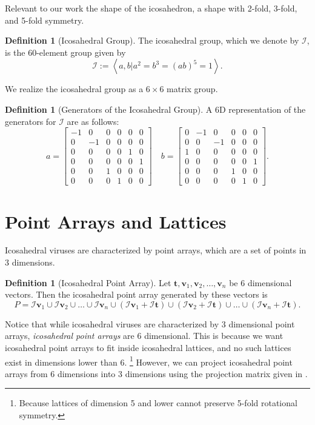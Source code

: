 \documentclass[a4paper,10pt]{article}
\let\oldfootnote\footnote
\renewcommand{\footnote}{\unskip\oldfootnote}
\theoremstyle{plain}
\theoremstyle{definition}
\newtheorem{Definition}[Theorem]{Definition}
\theoremstyle{remark}
\renewcommand{\vec}[1]{\mathbf{#1}}
\newcommand{\generatedby}[1]{\left\langle#1\right\rangle}
\begin{document}

Relevant to our work the shape of the icosahedron, a shape with 2-fold, 3-fold, and 5-fold symmetry.
\begin{Definition}[Icosahedral Group]
	The icosahedral group, which we denote by \(\mathcal{I}\), is the 60-element group given by \[\mathcal{I} := \generatedby{a, b | a^2 = b^3 = (ab)^5 = 1}.\]
\end{Definition}
\noindent We realize the icosahedral group as a \( 6 \times 6 \) matrix group.
\begin{Definition}[Generators of the Icosahedral Group]
	A 6D representation of the generators for \(\mathcal{I}\) are as follows:
	\[a = \begin{bmatrix}
		-1 & 0  & 0 & 0 & 0 & 0 \\
		0  & -1 & 0 & 0 & 0 & 0 \\
		0  & 0  & 0 & 0 & 1 & 0 \\
		0  & 0  & 0 & 0 & 0 & 1 \\
		0  & 0  & 1 & 0 & 0 & 0 \\
		0  & 0  & 0 & 1 & 0 & 0
	\end{bmatrix} \quad b = \begin{bmatrix}
		0 & -1 & 0  & 0 & 0 & 0 \\
		0 & 0  & -1 & 0 & 0 & 0 \\
		1 & 0  & 0  & 0 & 0 & 0 \\
		0 & 0  & 0  & 0 & 0 & 1 \\
		0 & 0  & 0  & 1 & 0 & 0 \\
		0 & 0  & 0  & 0 & 1 & 0
	\end{bmatrix}.\]
\end{Definition}

\section{Point Arrays and Lattices}
Icosahedral viruses are characterized by point arrays, which are a set of points in 3 dimensions.
\begin{Definition}[Icosahedral Point Array]
	Let \(\vec{t}, \vec{v}_1, \vec{v}_2, \dots, \vec{v}_n\) be 6 dimensional vectors.
	Then the icosahedral point array generated by these vectors is \[P = \mathcal{I}\vec{v}_1 \cup \mathcal{I}\vec{v}_2 \cup \dots \cup \mathcal{I}\vec{v}_n \cup (\mathcal{I}\vec{v}_1 + \mathcal{I}\vec{t}) \cup (\mathcal{I}\vec{v}_2 + \mathcal{I}\vec{t}) \cup \dots \cup (\mathcal{I}\vec{v}_n + \mathcal{I}\vec{t}).\]
\end{Definition}
Notice that while icosahedral viruses are characterized by 3 dimensional point arrays, \emph{icosahedral point arrays} are 6 dimensional.
This is because we want icosahedral point arrays to fit inside icosahedral lattices, and no such lattices exist in dimensions lower than 6.
\footnote{Because lattices of dimension 5 and lower cannot preserve 5-fold rotational symmetry.}
However, we can project icosahedral point arrays from 6 dimensions into 3 dimensions using the projection matrix given in \cite{indelicatoetal2012}.
\end{document}
